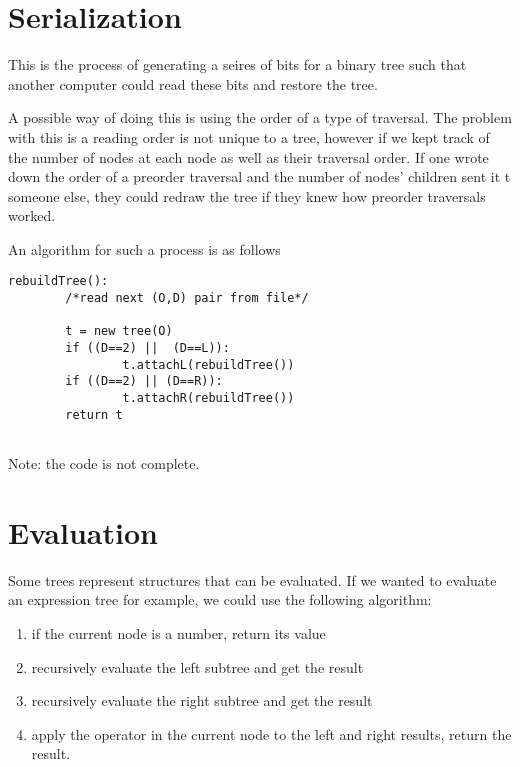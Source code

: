 \documentclass[12pt]{book}
\title{\coursetitle\linebreak\lecturename}
\author{\\Cain Susko\\ 
           \\ \\ \\
      Queen's University 
    \\School of Computing\\}
\begin{document}
\begin{titlepage}
        \maketitle
\end{titlepage}


\section*{Serialization}
This is the process of generating a seires of bits for a binary tree such that another computer could read these bits and 
        restore the tree.

A possible way of doing this is using the order of a type of traversal. 
The problem with this is a reading order is not unique to a tree, however if we kept track of the number of nodes
        at each node as well as their traversal order.
If one wrote down the order of a preorder traversal and the number of nodes' children sent it t someone else, 
they could redraw the tree if they knew how preorder traversals worked.

An algorithm for such a process is as follows
\begin{verbatim}
rebuildTree():
        /*read next (O,D) pair from file*/

        t = new tree(O)
        if ((D==2) ||  (D==L)):
                t.attachL(rebuildTree())
        if ((D==2) || (D==R)):
                t.attachR(rebuildTree())
        return t
        
\end{verbatim}
Note: the code is not complete.

\section*{Evaluation}
Some trees represent structures that can be evaluated.
If we wanted to evaluate an expression tree for example, we could use the following algorithm:
\begin{enumerate}
        \item if the current node is a number, return its value
        \item recursively evaluate the left subtree and get the result
        \item recursively evaluate the right subtree and get the result
        \item apply the operator in the current node to the left and right results, return the result.
\end{enumerate}
\end{document}
